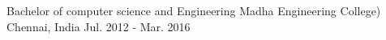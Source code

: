 

\begin{cventries}

  \cventry
    {Bachelor of computer science and Engineering} %
    {Madha Engineering College)} %
    {Chennai, India} %
    {Jul. 2012 - Mar. 2016} %
    {
      \begin{cvitems} %
      \end{cvitems}
    }

\end{cventries}
